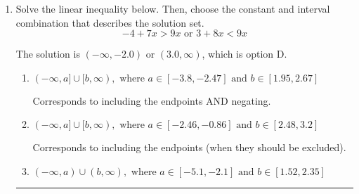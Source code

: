 \documentclass{extbook}[14pt]
\newcommand{\litem}[1]{\item #1

\rule{\textwidth}{0.4pt}}
\begin{document}
\begin{enumerate}
{\begin{enumerate}[label=\Alph*.]
$[1.20, -19.33)$, which corresponds to flipping the inequality and getting negatives of the actual endpoints.
\item \( (a, b], \text{ where } a \in [1.2, 8.2] \text{ and } b \in [-21.33, -13.33] \)

$(1.20, -19.33]$, which is the correct interval but negatives of the actual endpoints.
\item \( (-\infty, a) \cup [b, \infty), \text{ where } a \in [0, 3] \text{ and } b \in [-20.33, -14.33] \)

$(-\infty, 1.20) \cup [-19.33, \infty)$, which corresponds to displaying the and-inequality as an or-inequality and getting negatives of the actual endpoints.
\item \( (-\infty, a] \cup (b, \infty), \text{ where } a \in [1.2, 2.2] \text{ and } b \in [-21.33, -17.33] \)

$(-\infty, 1.20] \cup (-19.33, \infty)$, which corresponds to displaying the and-inequality as an or-inequality AND flipping the inequality AND getting negatives of the actual endpoints.
\item \( \text{None of the above.} \)

* This is correct as the answer should be $(-1.20, 19.33]$.
\end{enumerate}

\textbf{General Comment:} To solve, you will need to break up the compound inequality into two inequalities. Be sure to keep track of the inequality! It may be best to draw a number line and graph your solution.
}
\litem{
Solve the linear inequality below. Then, choose the constant and interval combination that describes the solution set.
\[ -4 + 7 x > 9 x \text{ or } 3 + 8 x < 9 x \]

The solution is \( (-\infty, -2.0) \text{ or } (3.0, \infty) \), which is option D.\begin{enumerate}[label=\Alph*.]
\item \( (-\infty, a] \cup [b, \infty), \text{ where } a \in [-3.8, -2.47] \text{ and } b \in [1.95, 2.67] \)

Corresponds to including the endpoints AND negating.
\item \( (-\infty, a] \cup [b, \infty), \text{ where } a \in [-2.46, -0.86] \text{ and } b \in [2.48, 3.2] \)

Corresponds to including the endpoints (when they should be excluded).
\item \( (-\infty, a) \cup (b, \infty), \text{ where } a \in [-5.1, -2.1] \text{ and } b \in [1.52, 2.35] \)


\end{enumerate}}
\end{enumerate}
\end{document}
